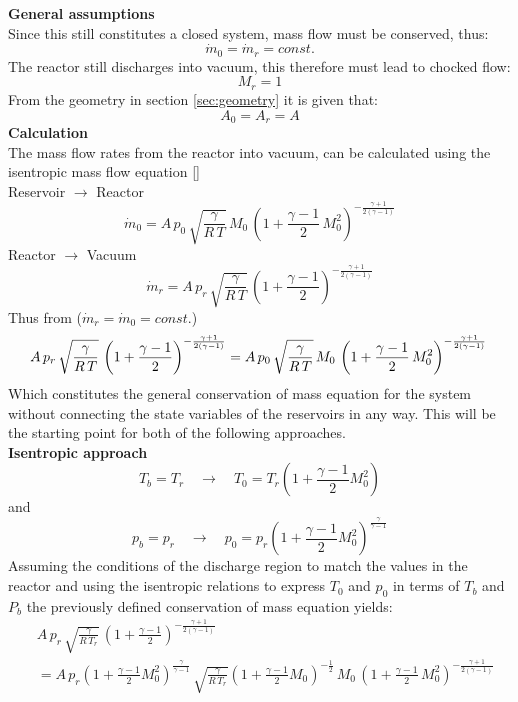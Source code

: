	\textbf{General assumptions}\\
		Since this still constitutes a closed system, mass flow must be conserved, thus:
		$$
			\dot{m}_0 = \dot{m}_r = const.
		$$
		The reactor still discharges into vacuum, this therefore must lead to chocked flow:
		$$
			M_r = 1
		$$
		From the geometry in section \ref{sec:geometry} it is given that:
		$$
			A_0 = A_r = A
		$$
	\textbf{Calculation}\\
		The mass flow rates from the reactor into vacuum, can be calculated using the isentropic mass flow equation \eqref{}\\
		Reservoir $\to$ Reactor
		$$
			\dot{m}_0 = A\, p_0\, \sqrt{\frac{\gamma}{R\,T}}\, M_0\,\left(1+\frac{\gamma-1}{2}\,M_0^2\right)^{-\frac{\gamma+1}{2(\gamma-1)}}
		$$
		Reactor $\to$ Vacuum
		$$
			\dot{m}_r = A\, p_r\, \sqrt{\frac{\gamma}{R\,T}}\,\left(1+\frac{\gamma-1}{2}\right)^{-\frac{\gamma+1}{2(\gamma-1)}}
		$$
		Thus from ($\dot{m}_r = \dot{m}_0 = const.$)
		$$
			A\, p_r\, \sqrt{\frac{\gamma}{R\,T}}\,\left(1+\frac{\gamma-1}{2}\right)^{-\frac{\gamma+1}{2(\gamma-1)}}
			=  A\, p_0\, \sqrt{\frac{\gamma}{R\,T}}\, M_0\,\left(1+\frac{\gamma-1}{2}\,M_0^2\right)^{-\frac{\gamma+1}{2(\gamma-1)}}\\\\
		$$
		Which constitutes the general conservation of mass equation for the system without connecting the state variables of the reservoirs in any way.
		This will be the starting point for both of the following approaches.\\
	\textbf{Isentropic approach}\\
		$$
			T_b = T_r
			\quad \to \quad
			T_0 = T_r \left(1 + \frac{\gamma - 1}{2}M_0^2 \right)
		$$
		and
		$$
			p_b = p_r
			\quad \to \quad
			p_0 = p_r \left(1 + \frac{\gamma - 1}{2}M_0^2 \right)^{\frac{\gamma}{\gamma - 1}}
		$$
		Assuming the conditions of the discharge region to match the values in the reactor and using the isentropic relations to express $T_0$ and $p_0$ in terms of $T_b$ and $P_b$ the previously defined conservation of mass equation yields:
		\begin{align*}
			&A\, p_r\, \sqrt{\frac{\gamma}{R\,T_r}}\,\left(1+\frac{\gamma-1}{2}\right)^{-\frac{\gamma+1}{2(\gamma-1)}}\\
			&= A\, p_r\left(1 + \frac{\gamma - 1}{2}M_0^2\right)^{\frac{\gamma}{\gamma-1}}\, \sqrt{\frac{\gamma}{R\,T_r}}\left(1 + \frac{\gamma - 1}{2}M_0\right)^{-\frac{1}{2}}\, M_0\,\left(1+\frac{\gamma-1}{2}\,M_0^2\right)^{-\frac{\gamma+1}{2(\gamma-1)}}\\\\
		\end{align*}

